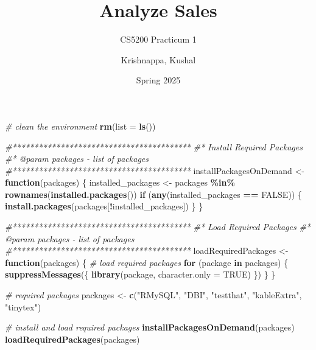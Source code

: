 \documentclass[
]{article}
\title{Analyze Sales}
\subtitle{CS5200 Practicum 1}
\author{Krishnappa, Kushal}
\date{Spring 2025}
\newenvironment{Shaded}{\begin{snugshade}}{\end{snugshade}}
\newcommand{\AttributeTok}[1]{\textcolor[rgb]{0.13,0.29,0.53}{#1}}
\newcommand{\CommentTok}[1]{\textcolor[rgb]{0.56,0.35,0.01}{\textit{#1}}}
\newcommand{\ConstantTok}[1]{\textcolor[rgb]{0.56,0.35,0.01}{#1}}
\newcommand{\ControlFlowTok}[1]{\textcolor[rgb]{0.13,0.29,0.53}{\textbf{#1}}}
\newcommand{\FunctionTok}[1]{\textcolor[rgb]{0.13,0.29,0.53}{\textbf{#1}}}
\newcommand{\NormalTok}[1]{#1}
\newcommand{\OtherTok}[1]{\textcolor[rgb]{0.56,0.35,0.01}{#1}}
\newcommand{\SpecialCharTok}[1]{\textcolor[rgb]{0.81,0.36,0.00}{\textbf{#1}}}
\newcommand{\StringTok}[1]{\textcolor[rgb]{0.31,0.60,0.02}{#1}}
\begin{document}
\maketitle

\begin{Shaded}
\begin{Highlighting}[]
\CommentTok{\# clean the environment}
\FunctionTok{rm}\NormalTok{(}\AttributeTok{list =} \FunctionTok{ls}\NormalTok{())}
\end{Highlighting}
\end{Shaded}

\begin{Shaded}
\begin{Highlighting}[]
\CommentTok{\#*****************************************}
\CommentTok{\#* Install Required Packages}
\CommentTok{\#* @param packages {-} list of packages}
\CommentTok{\#*****************************************}
\NormalTok{installPackagesOnDemand }\OtherTok{\textless{}{-}} \ControlFlowTok{function}\NormalTok{(packages) \{}
\NormalTok{  installed\_packages }\OtherTok{\textless{}{-}}\NormalTok{ packages }\SpecialCharTok{\%in\%} \FunctionTok{rownames}\NormalTok{(}\FunctionTok{installed.packages}\NormalTok{())}
  \ControlFlowTok{if}\NormalTok{ (}\FunctionTok{any}\NormalTok{(installed\_packages }\SpecialCharTok{==} \ConstantTok{FALSE}\NormalTok{)) \{}
    \FunctionTok{install.packages}\NormalTok{(packages[}\SpecialCharTok{!}\NormalTok{installed\_packages])}
\NormalTok{  \}}
\NormalTok{\}}

\CommentTok{\#*****************************************}
\CommentTok{\#* Load Required Packages}
\CommentTok{\#* @param packages {-} list of packages}
\CommentTok{\#*****************************************}
\NormalTok{loadRequiredPackages }\OtherTok{\textless{}{-}} \ControlFlowTok{function}\NormalTok{(packages) \{}
  \CommentTok{\# load required packages}
  \ControlFlowTok{for}\NormalTok{ (package }\ControlFlowTok{in}\NormalTok{ packages) \{}
    \FunctionTok{suppressMessages}\NormalTok{(\{}
      \FunctionTok{library}\NormalTok{(package, }\AttributeTok{character.only =} \ConstantTok{TRUE}\NormalTok{)}
\NormalTok{    \})}
\NormalTok{  \}}
\NormalTok{\}}

\CommentTok{\# required packages}
\NormalTok{packages }\OtherTok{\textless{}{-}} \FunctionTok{c}\NormalTok{(}\StringTok{"RMySQL"}\NormalTok{, }\StringTok{"DBI"}\NormalTok{, }\StringTok{"testthat"}\NormalTok{, }\StringTok{"kableExtra"}\NormalTok{, }\StringTok{"tinytex"}\NormalTok{)}
  
\CommentTok{\# install and load required packages}
\FunctionTok{installPackagesOnDemand}\NormalTok{(packages)}
\FunctionTok{loadRequiredPackages}\NormalTok{(packages)}
\end{Highlighting}
\end{Shaded}
\end{document}
